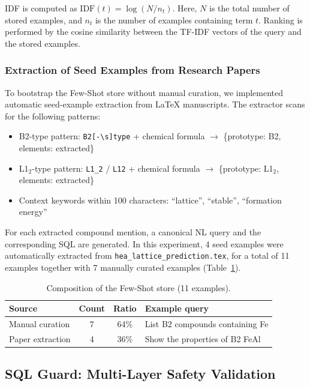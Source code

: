 \documentclass[5p,twocolumn]{elsarticle}
\begin{document}
IDF is computed as $\text{IDF}(t) = \log(N / n_t)$.
Here, $N$ is the total number of stored examples, and $n_t$ is the number of examples containing term $t$.
Ranking is performed by the cosine similarity between the TF-IDF vectors of the query and the stored examples.

\subsubsection{Extraction of Seed Examples from Research Papers}

To bootstrap the Few-Shot store without manual curation,
we implemented automatic seed-example extraction from LaTeX manuscripts.
The extractor scans for the following patterns:

\begin{itemize}
  \item B2-type pattern: \texttt{B2[-\textbackslash{}s]type} + chemical formula $\to$ \{prototype: B2, elements: extracted\}
  \item L1$_2$-type pattern: \texttt{L1\_2} / \texttt{L12} + chemical formula $\to$ \{prototype: L1$_2$, elements: extracted\}
  \item Context keywords within 100 characters: ``lattice'', ``stable'', ``formation energy''
\end{itemize}

For each extracted compound mention, a canonical NL query and the corresponding SQL are generated.
In this experiment, 4 seed examples were automatically extracted from \texttt{hea\_lattice\_prediction.tex},
for a total of 11 examples together with 7 manually curated examples (Table~\ref{tab:few_shot_sources}).

\begin{table}[htbp]
  \centering
  \caption{Composition of the Few-Shot store (11 examples).}
  \label{tab:few_shot_sources}
  \scriptsize
  \begin{tabular}{lccp{3.5cm}}
    \toprule
    Source & Count & Ratio & Example query \\
    \midrule
    Manual curation & 7 & 64\% & List B2 compounds containing Fe \\
    Paper extraction & 4 & 36\% & Show the properties of B2 FeAl \\
    \bottomrule
  \end{tabular}
\end{table}

\subsection{SQL Guard: Multi-Layer Safety Validation}
\label{sec:sql_guard}
\end{document}
